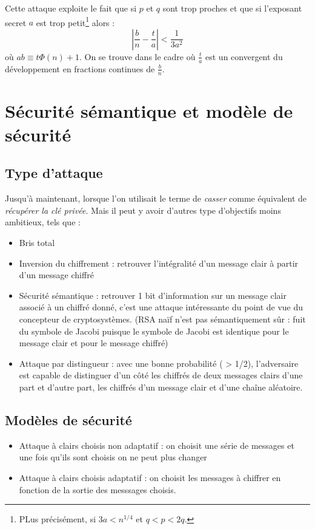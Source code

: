 \documentclass[a4paper, 10pt]{thesis}
\begin{document}
Cette attaque exploite le fait que si $p$ et $q$ sont trop proches et que si l'exposant secret $a$
est trop petit\footnote{PLus précisément, si $3a < n^{1/4}$ et $q < p < 2q$.} alors :
\begin{displaymath}
    \left | \frac{b}{n} - \frac{t}{a} \right | < \frac{1}{3a^2}
\end{displaymath}
où $ab \equiv t \Phi(n) + 1$. On se trouve dans le cadre où $\frac{t}{a}$ est un convergent du
développement en fractions continues de $\frac{b}{n}$.

\section{Sécurité sémantique et modèle de sécurité}

\subsection{Type d'attaque}

Jusqu'à maintenant, lorsque l'on utilisait le terme de \emph{casser} comme équivalent de
\emph{récupérer la clé privée}. Mais il peut y avoir d'autres type d'objectifs moins ambitieux, tels
que : 
\begin{itemize}
    \item Bris total
    \item Inversion du chiffrement : retrouver l'intégralité d'un message clair à partir d'un
        message chiffré
    \item Sécurité sémantique : retrouver 1 bit d'information sur un message clair associé à un
        chiffré donné, c'est une attaque intéressante du point de vue du concepteur de
        cryptosystèmes. (RSA naïf n'est pas sémantiquement sûr : fuit du symbole de Jacobi puisque
        le symbole de Jacobi est identique pour le message clair et pour le message chiffré)
    \item Attaque par distingueur : avec une bonne probabilité ( > 1/2), l'adversaire est capable de
        distinguer d'un côté les chiffrés de deux messages clairs d'une part et d'autre part, les
        chiffrés d'un message clair et d'une chaîne aléatoire.
\end{itemize}

\subsection{Modèles de sécurité}

\begin{itemize}
    \item Attaque à clairs choisis non adaptatif : on choisit une série de messages et une fois
        qu'ils sont choisis on ne peut plus changer
    \item Attaque à clairs choisis adaptatif : on choisit les messages à chiffrer en fonction de la
        sortie des messsages choisis.
\end{itemize}
\end{document}
